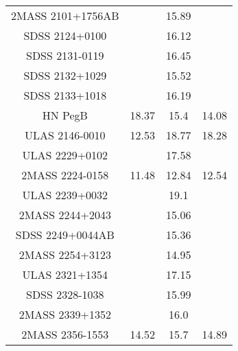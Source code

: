 \begin{table}
\begin{tabular}{cccc}
2MASS 2101+1756AB &  & 15.89 &  \\
SDSS 2124+0100 &  & 16.12 &  \\
SDSS 2131-0119 &  & 16.45 &  \\
SDSS 2132+1029 &  & 15.52 &  \\
SDSS 2133+1018 &  & 16.19 &  \\
HN PegB & 18.37 & 15.4 & 14.08 \\
ULAS 2146-0010 & 12.53 & 18.77 & 18.28 \\
ULAS 2229+0102 &  & 17.58 &  \\
2MASS 2224-0158 & 11.48 & 12.84 & 12.54 \\
ULAS 2239+0032 &  & 19.1 &  \\
2MASS 2244+2043 &  & 15.06 &  \\
SDSS 2249+0044AB &  & 15.36 &  \\
2MASS 2254+3123 &  & 14.95 &  \\
ULAS 2321+1354 &  & 17.15 &  \\
SDSS 2328-1038 &  & 15.99 &  \\
2MASS 2339+1352 &  & 16.0 &  \\
2MASS 2356-1553 & 14.52 & 15.7 & 14.89 \\
\end{tabular}
\end{table}
